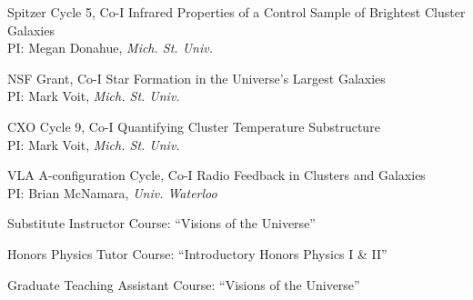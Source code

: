 \documentclass[12pt]{cv}
\begin{document}
\begin{llist}
Spitzer Cycle 5, Co-I
Infrared Properties of a Control Sample of Brightest Cluster Galaxies\\%
PI: Megan Donahue, {\textit{Mich. St. Univ.}}

NSF Grant, Co-I
Star Formation in the Universe's Largest Galaxies\\%
PI: Mark Voit, {\textit{Mich. St. Univ.}}

CXO Cycle 9, Co-I
Quantifying Cluster Temperature Substructure\\%
PI: Mark Voit, {\textit{Mich. St. Univ.}}

VLA A-configuration Cycle, Co-I
Radio Feedback in Clusters and Galaxies\\%
PI: Brian McNamara, {\textit{Univ. Waterloo}}





Substitute Instructor
Course: ``Visions of the Universe''

Honors Physics Tutor
Course: ``Introductory Honors Physics I \& II''

Graduate Teaching Assistant
Course: ``Visions of the Universe''





\end{llist}
\end{document}
